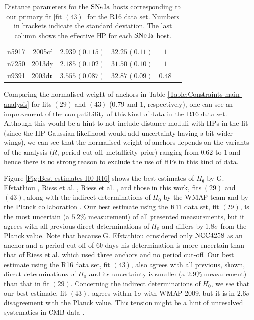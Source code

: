 \begin{table}[tbp]
\begin{tabular}{@{}lccccr}
 n5917 & 2005cf & $2.939\,(0.115)$& $32.25\,(0.11)$& $ 1$ \\
       
 n7250 & 2013dy & $2.185\,(0.102)$& $31.50\,(0.10)$& $ 1$ \\
        
 u9391 & 2003du & $3.555\,(0.087)$& $32.87\,(0.09)$& $ 0.48$ \\
         
\hline
\end{tabular}
\caption{\label{Table:SNIa-HP-fit-43} Distance parameters for the $\mathrm{SNe\,Ia}$ hosts corresponding to our primary fit [fit $(43)$] for the R16 data set. Numbers in brackets indicate the standard deviation. The last column shows the effective HP for each $\mathrm{SNe\,Ia}$ host.}
\end{table}

Comparing the normalised weight of anchors in Table \ref{Table:Constraints-main-analysis} for fits $(29)$ and $(43)$ ($0.79$ and  $1$, respectively), one can see an improvement of the compatibility of this kind of data in the R16 data set. Although this would be a hint to not include distance moduli with HPs in the fit (since the HP Gaussian likelihood would add uncertainty having a bit wider wings), we can see that the normalised weight of anchors depends on the variants of the analysis ($R$, period cut-off, metallicity prior) ranging from $0.62$ to $1$ and hence there is no strong reason to exclude the use of HPs in this kind of data. 

Figure \ref{Fig:Best-estimates-H0-R16} shows the best estimates of $H_0$ by G. Efstathiou \cite{Efstathiou:2013via}, Riess et al. \cite{Riess:2011yx}, Riess et al. \cite{Riess:2016jrr}, and those in this work, fits $(29)$ and $(43)$, along with the indirect determinations of $H_0$ by the WMAP team \cite{Hinshaw:2012aka} and by the Planck collaboration \cite{Ade:2015xua}. Our best estimate using the R11 data set, fit $(29)$, is the most uncertain (a $5.2\%$ measurement) of all presented measurements, but it agrees with all previous direct determinations of $H_0$ and differs by $1.8\sigma$ from the Planck value. Note that because G. Efstathiou considered only $\mathrm{NGC4258}$ as an anchor and a period cut-off of $60$ days his determination is more uncertain than that of Riess et al. \cite{Riess:2011yx} which used three anchors and no period cut-off. Our best estimate using the R16 data set, fit $(43)$, also agrees with all previous, shown, direct determinations of $H_0$ and its uncertainty is smaller (a $2.9\%$ measurement) than that in fit $(29)$. Concerning the indirect determinations of $H_0$, we see that our best estimate, fit $(43)$, agrees within $1\sigma$ with WMAP 2009, but it is in $2.6\sigma$ disagreement with the Planck value. This tension might be a hint of unresolved systematics in CMB data \cite{Riess:2016jrr}. 

